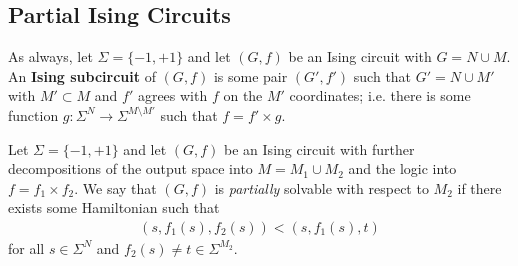 \documentclass{article}
\begin{document}
\subsection{Partial Ising Circuits}

\begin{defn}\label{defn:ising-subcircuit}
  As always, let $\Sigma = \{-1,+1\}$ and let $(G,f)$ be an Ising circuit with $G = N \cup M$. An \textbf{Ising subcircuit} of $(G,f)$ is some pair $(G', f')$ such that $G' = N\cup M'$ with $M' \subset M$ and $f'$ agrees with $f$ on the $M'$ coordinates; i.e. there is some function $g:\Sigma^N \to \Sigma^{M \setminus M'}$ such that $f = f'\times g$.
\end{defn}

\begin{defn}\label{defn:partial-ising}
  Let $\Sigma = \{-1, +1\}$ and let $(G,f)$ be an Ising circuit with further decompositions of the output space into $M = M_1 \cup M_2$ and the logic into $f = f_1\times f_2$. We say that $(G,f)$ is \emph{partially} solvable with respect to $M_2$ if there exists some Hamiltonian such that
  \begin{align*}
    (s,f_1(s),f_2(s)) < (s,f_1(s),t)
  \end{align*}
  for all $s \in \Sigma^N$ and $f_2(s) \neq t \in \Sigma^{M_2}$.
\end{defn}
\end{document}
